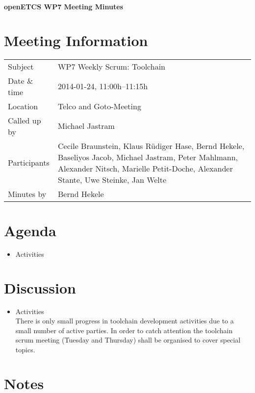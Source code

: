\documentclass[a4paper, 11pt]{article}
\begin{document}
{\begin{center}\huge\bf openETCS WP7 Meeting Minutes\end{center}}
\section{Meeting Information}

\renewcommand{\arraystretch}{1.5}
\begin{supertabular}{m{.2\textwidth}m{.8\textwidth}}
Subject & WP7 Weekly Scrum: Toolchain\\
Date \& time & 2014-01-24, 11:00h--11:15h\\
Location & Telco and Goto-Meeting\\
Called up by & Michael Jastram\\
Participants &
Cecile Braunstein,
Klaus R\"udiger Hase,
Bernd Hekele,
Baseliyos Jacob,
Michael Jastram,
Peter Mahlmann,
Alexander Nitsch,
Marielle Petit-Doche,
Alexander Stante,
Uwe Steinke,
Jan Welte
\\

Minutes by & Bernd Hekele\\

\end{supertabular}
\renewcommand{\arraystretch}{1.0}


\section{Agenda}
\begin{itemize}
\item Activities
\end{itemize}

\section{Discussion}

\begin{itemize}
\item Activities\\
There is only small progress in toolchain development activities due to a small number of active parties. In order to catch attention the toolchain scrum meeting (Tuesday and Thursday) shall be organised to cover special topics.

\end{itemize}

\section{Notes}
\end{document}
